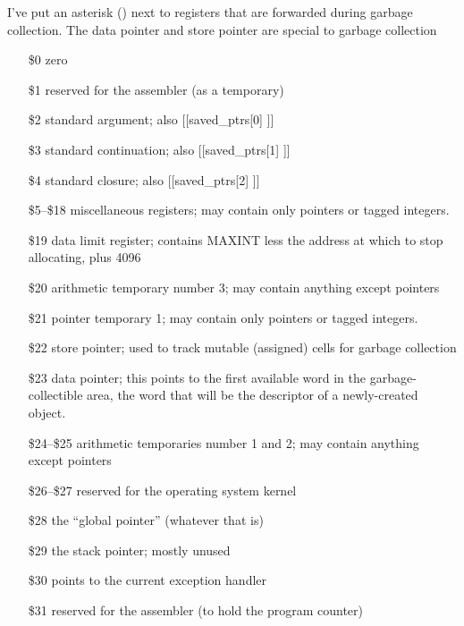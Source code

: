 \def\*{\rlap{${}^*$}}
I've put an asterisk (\*) next to registers that are forwarded
during garbage collection.
The data pointer and store pointer are special to garbage collection
\begin{itemize}
\item[\$0] zero
\item[\$1] reserved for the assembler (as a temporary)
\item[\$2\*] standard argument; also [[saved_ptrs[0] ]]
\item[\$3\*] standard continuation; also [[saved_ptrs[1] ]]
\item[\$4\*] standard closure; also [[saved_ptrs[2] ]]
\item[\$5--\$18\*] miscellaneous registers; 
		may contain only pointers or tagged integers.
\item[\$19] data  limit register; contains MAXINT less the address at
		which to stop allocating, plus 4096
\item[\$20] arithmetic temporary number 3; 
		may contain anything except pointers
\item[\$21\*] pointer temporary 1; 
		may contain only pointers or tagged integers.
\item[\$22\*] store pointer;
		used to track mutable (assigned) cells for garbage collection
\item[\$23] data pointer;
		this points to the first available word in the 
		garbage-collectible area, the word that will be the
		descriptor of a newly-created object.
\item[\$24--\$25] arithmetic temporaries number 1 and 2;
		may contain anything except pointers
\item[\$26--\$27] reserved for the operating system kernel
\item[\$28]	the ``global pointer'' (whatever that is)
\item[\$29]	the stack pointer; mostly unused
\item[\$30\*] points to the current exception handler
\item[\$31] reserved for the assembler (to hold the program counter)
\end{itemize} 
